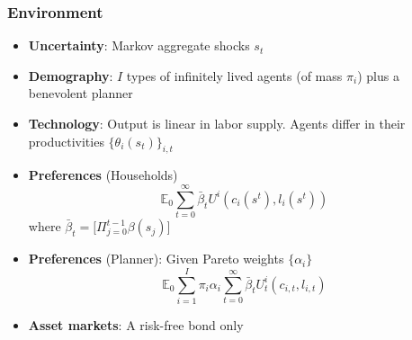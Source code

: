 \documentclass{beamer}
\begin{document}
\begin{frame}
 \frametitle{Environment}
 \begin{itemize}
 \item \textbf{Uncertainty}: Markov aggregate shocks $s_t$
  \item \textbf{Demography}: $I$ types of infinitely lived agents (of mass $\pi_i$)  plus a benevolent planner
  \item \textbf{Technology}: Output is linear in labor supply. Agents differ in their productivities $\{\theta_i(s_t)\}_{i,t}$
  \item \textbf{Preferences }(Households)
  \begin{equation*}
\mathbb{E}_{0}\sum_{t=0}^{\infty } \bar{\beta}_t  U^{i}\left(
c_{i}(s^t),l_{i}(s^t)\right)  \label{utility lifetime}
\end{equation*}%
where $\bar{\beta}_t=\bigl[\Pi_{j=0}^{t-1}\beta(s_j)\bigr]$
\item \textbf{Preferences} (Planner): Given Pareto weights $\{\alpha_i\}$
\begin{equation*}
\mathbb{E}_{0}\sum_{i=1}^{I}\pi _{i}\alpha _{i}\sum_{t=0}^{\infty }\bar{\beta}_t U_{t}^{i}\left( c_{i,t},l_{i,t}\right)  \label{govmt objective}
\end{equation*}
  \item \textbf{Asset markets}: A risk-free bond only
  \end{itemize}

\end{frame}
\end{document}
